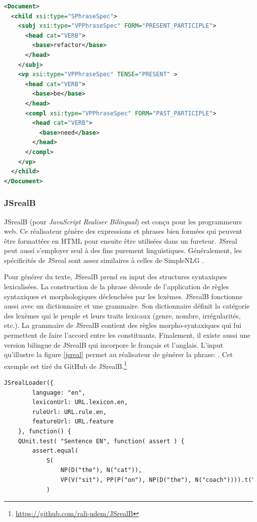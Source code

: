 \begin{lstlisting}[language=Xml, caption=Structure d'input dans SimpleNLG, label=simplenlg]
<Document>
  <child xsi:type="SPhraseSpec">
    <subj xsi:type="VPPhraseSpec" FORM="PRESENT_PARTICIPLE">
      <head cat="VERB">
        <base>refactor</base>
      </head>
    </subj>
    <vp xsi:type="VPPhraseSpec" TENSE="PRESENT" >
      <head cat="VERB">
        <base>be</base>
      </head>
      <compl xsi:type="VPPhraseSpec" FORM="PAST_PARTICIPLE">
        <head cat="VERB">
          <base>need</base>
        </head>
      </compl>
    </vp>
  </child>
</Document>
\end{lstlisting}

\subsubsection{JSrealB}
JSrealB (pour \emph{JavaScript Realiser Bilingual}) \citep{DBLP:conf/enlg/MolinsL15} est conçu pour les programmeurs web. Ce réalisateur génère des expressions et phrases bien formées qui peuvent être formattées en HTML pour ensuite être utilisées dans un fureteur. JSreal peut aussi s'employer seul à des fins purement linguistiques. Généralement, les spécificités de JSreal sont assez similaires à celles de SimpleNLG \citep{GattSimpleNLGRealisationEngine2009}.

Pour générer du texte, JSrealB prend en input des structures syntaxiques lexicalisées. La construction de la phrase découle de l'application de règles syntaxiques et morphologiques déclenchées par les lexèmes. JSrealB fonctionne aussi avec un dictionnaire et une grammaire. Son dictionnaire définit la catégorie des lexèmes qui le peuple et leurs traits lexicaux (genre, nombre, irrégularités, etc.). La grammaire de JSrealB contient des règles morpho-syntaxiques qui lui permettent de faire l'accord entre les constituants. Finalement, il existe aussi une version bilingue de JSrealB \citep{MolinsJSrealBBilingualText2015} qui incorpore le français et l'anglais. L'input qu'illustre la figure \ref{jsreal} permet au réalisateur de générer la phrase: . Cet exemple est tiré du GitHub de JSrealB.\footnote{\url{https://github.com/rali-udem/JSrealB}}

\begin{lstlisting}[language=Xml, caption=JSreal, label=jsreal]
JSrealLoader({
        language: "en",
        lexiconUrl: URL.lexicon.en,
        ruleUrl: URL.rule.en,
        featureUrl: URL.feature
    }, function() {
    QUnit.test( "Sentence EN", function( assert ) {
        assert.equal(
            S(
                NP(D("the"), N("cat")),
                VP(V("sit"), PP(P("on"), NP(D("the"), N("coach")))).t("ps")
            )
\end{lstlisting}
		
